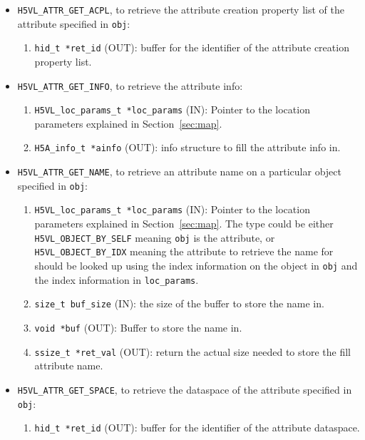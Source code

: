 \begin{itemize}

\item \texttt{H5VL\_ATTR\_GET\_ACPL}, to retrieve the attribute creation
  property list of the attribute specified in \texttt{obj}:
  \begin{enumerate}
  \item \texttt{hid\_t *ret\_id} (OUT): buffer for the identifier of the
    attribute creation property list.
  \end{enumerate}

\item \texttt{H5VL\_ATTR\_GET\_INFO}, to retrieve the attribute info:
  \begin{enumerate}
  \item \texttt{H5VL\_loc\_params\_t *loc\_params} (IN): Pointer to the location parameters
    explained in Section~\ref{sec:map}. 
  \item \texttt{H5A\_info\_t *ainfo} (OUT): info structure to fill the
    attribute info in.
  \end{enumerate}

\item \texttt{H5VL\_ATTR\_GET\_NAME}, to retrieve an attribute name on a
  particular object specified in \texttt{obj}:
  \begin{enumerate}
  \item \texttt{H5VL\_loc\_params\_t *loc\_params} (IN): Pointer to the location parameters
    explained in Section~\ref{sec:map}. The type could be either
    \texttt{H5VL\_OBJECT\_BY\_SELF} meaning \texttt{obj} is the attribute,
    or \texttt{H5VL\_OBJECT\_BY\_IDX} meaning the attribute to retrieve
    the name for should be looked up using the index information on
    the object in \texttt{obj} and the index information in \texttt{loc\_params}.
  \item \texttt{size\_t buf\_size} (IN): the size of the buffer to store
    the name in.
  \item \texttt{void *buf} (OUT): Buffer to store the name in.
  \item \texttt{ssize\_t *ret\_val} (OUT): return the actual size needed
    to store the fill attribute name.
  \end{enumerate}

\item \texttt{H5VL\_ATTR\_GET\_SPACE}, to retrieve the dataspace of the
  attribute specified in \texttt{obj}:
  \begin{enumerate}
  \item \texttt{hid\_t *ret\_id} (OUT): buffer for the identifier of the
    attribute dataspace.
  \end{enumerate}


\end{itemize}
